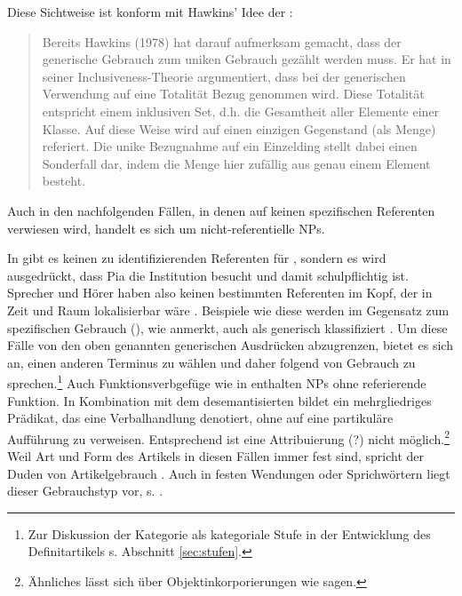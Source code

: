 Diese Sichtweise ist konform mit Hawkins' Idee der :  \blockcquote[43]{Studler2011}{Bereits Hawkins (1978) hat darauf aufmerksam gemacht, dass der generische Gebrauch zum uniken Gebrauch gezählt werden muss. Er hat in seiner Inclusiveness-Theorie argumentiert, dass bei der generischen Verwendung auf eine Totalität Bezug genommen wird. Diese Totalität entspricht einem inklusiven Set, d.h. die Gesamtheit
aller Elemente einer Klasse. Auf diese Weise wird auf einen einzigen Gegenstand (als
Menge) referiert. Die unike Bezugnahme auf ein Einzelding stellt dabei einen Sonderfall
dar, indem die Menge hier zufällig aus genau einem Element besteht.} 



Auch in den nachfolgenden Fällen, in denen  auf keinen spezifischen Referenten verwiesen wird, handelt es sich um nicht-referentielle NPs. 

\begin{exe}
	\ex \label{ex:nonref}   
	\begin{xlist}
		\ex \label{ex:schule-pia}  
		\ex \label{ex:fvg} 
		\end{xlist}
\end{exe}
\noindent 
In  gibt es keinen zu identifizierenden Referenten für , sondern es wird ausgedrückt, dass Pia die Institution  besucht und damit schulpflichtig ist. Sprecher und Hörer haben also keinen bestimmten Referenten im Kopf, der in Zeit und Raum lokalisierbar wäre \parencite[40]{Bisle-Muller1991}. Beispiele wie diese werden im Gegensatz zum spezifischen Gebrauch (), wie \textcite[245]{Studler2011} anmerkt, auch als generisch klassifiziert \parencite[ähnlich][90]{Szczepaniak2011a}. Um diese Fälle von den oben genannten generischen Ausdrücken abzugrenzen, bietet es sich an, einen anderen Terminus zu wählen und daher \textcite[54]{Bisle-Muller1991} folgend von  Gebrauch zu sprechen.\footnote{Zur Diskussion der Kategorie  als kategoriale Stufe in der Entwicklung des Definitartikels s. Abschnitt \ref{sec:stufen}.} Auch Funktionsverbgefüge wie in  enthalten NPs ohne referierende Funktion. In Kombination mit dem desemantisierten  bildet  ein mehrgliedriges Prädikat, das eine Verbalhandlung denotiert, ohne auf eine partikuläre Aufführung zu verweisen. Entsprechend ist eine Attribuierung (?) nicht möglich.\footnote{Ähnliches lässt sich über Objektinkorporierungen wie  sagen.} Weil Art und Form des Artikels in diesen Fällen immer fest sind, spricht der Duden von  Artikelgebrauch \parencite[297-298]{Duden2009}. Auch in festen Wendungen oder Sprichwörtern liegt dieser Gebrauchstyp vor, s.   \parencite[298]{Duden2009}.  

